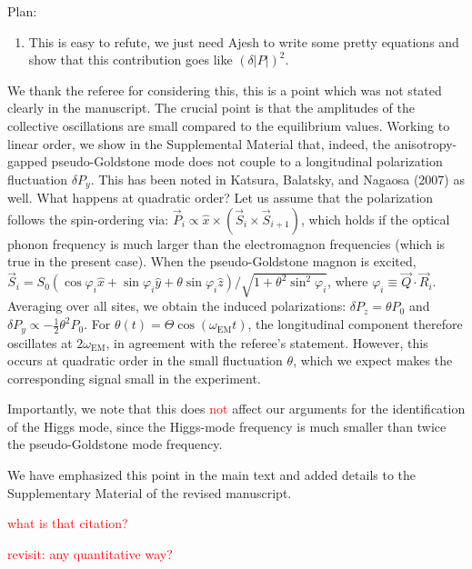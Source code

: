 Plan:
\begin{enumerate}
\item This is easy to refute, we just need Ajesh to write some pretty equations and show that this contribution goes like $(\delta|P|)^2$.
\end{enumerate}

We thank the referee for considering this, this is a point which was not stated clearly in the manuscript.
The crucial point is that the amplitudes of the collective oscillations are small compared to the equilibrium values.
Working to linear order, we show in the Supplemental Material that, indeed, the anisotropy-gapped pseudo-Goldstone mode does not couple to a longitudinal polarization fluctuation $\delta P_y$.
This has been noted in Katsura, Balatsky, and Nagaosa (2007) as well.
What happens at quadratic order?
Let us assume that the polarization follows the spin-ordering via: $\vec{P}_i \propto \hat{x} \times (\vec{S}_i \times \vec{S}_{i+1})$, which holds if the optical phonon frequency is much larger than the electromagnon frequencies (which is true in the present case).
When the pseudo-Goldstone magnon is excited, $\vec{S}_i = S_0 \left( \cos \varphi_i \hat{x} + \sin \varphi_i \hat{y} + \theta \sin \varphi_i \hat{z}\right)/\sqrt{1 + \theta^2 \sin^2 \varphi_i} $, where $\varphi_i \equiv \vec{Q} \cdot \vec{R}_i$.
Averaging over all sites, we obtain the induced polarizations: $\delta P_z = \theta P_0$ and $\delta P_y \propto -\frac{1}{2} \theta^2 P_0$. 
For $\theta(t) = \Theta\cos(\omega_{\mathrm{EM}} t)$, the longitudinal component therefore oscillates at $2\omega_{\mathrm{EM}}$, in agreement with the referee's statement.
However, this occurs at quadratic order in the small fluctuation $\theta$, which we expect makes the corresponding signal small in the experiment.

Importantly, we note that this does \textcolor{red}{not} affect our arguments for the identification of the Higgs mode, since the Higgs-mode frequency is much smaller than twice the pseudo-Goldstone mode frequency.

\begin{changesmade}
We have emphasized this point in the main text and added details to the Supplementary Material of the revised manuscript.
\end{changesmade}

\textcolor{red}{what is that citation?}

\textcolor{red}{revisit: any quantitative way?}
